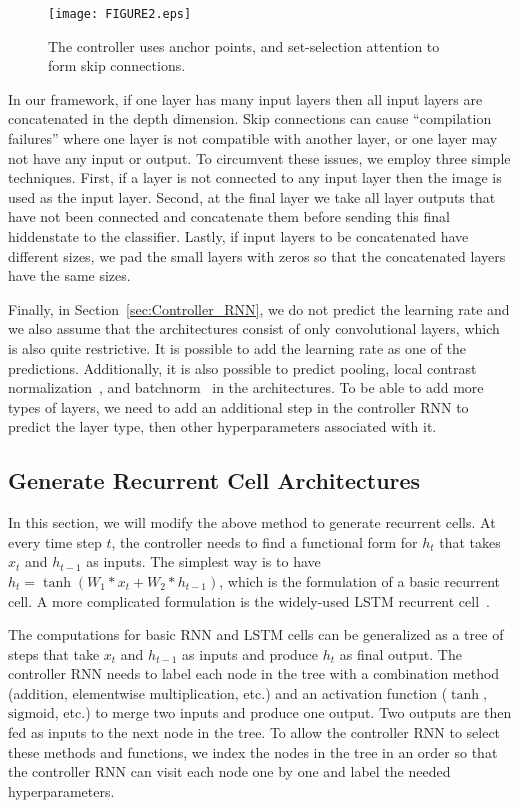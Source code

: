\documentclass{article} \usepackage{iclr2017_conference,times}
\begin{document}
\begin{figure}[h!]
\begin{center}
\centerline{\texttt{[image: FIGURE2.eps]}}
\caption{The controller uses anchor points, and set-selection attention to form skip connections.}
\label{figure:Controller_RNN_PTR}
\end{center}
\end{figure} 

In our framework, if one layer has many input layers then all input layers are concatenated in the depth dimension. Skip connections can cause ``compilation failures'' where one layer is not compatible with another layer, or one layer may not have any input or output. To circumvent these issues, we employ three simple techniques. First, if a layer is not connected to any input layer then the image is used as the input layer. Second, at the final layer we take all layer outputs that have not been connected and concatenate them before sending this final hiddenstate to the classifier. Lastly, if input layers to be concatenated have different sizes, we pad the small layers with zeros so that the concatenated layers have the same sizes. 

Finally, in Section~\ref{sec:Controller_RNN}, we do not predict the learning rate and we also assume that the architectures consist of only convolutional layers, which is also quite restrictive. It is possible to add the learning rate as one of the predictions. Additionally, it is also possible to predict pooling, local contrast normalization~\citep{jarrett2009best,krizhevsky2012imagenet}, and batchnorm~\citep{BatchNorm} in the architectures. To be able to add more types of layers, we need to add an additional step in the controller RNN to predict the layer type, then other hyperparameters associated with it. 


\subsection{Generate Recurrent Cell Architectures}
\label{sec:recurrent_cell}
In this section, we will modify the above method to generate recurrent cells. At every time step $t$, the controller needs to find a functional form for $h_t$ that takes $x_t$ and $h_{t-1}$ as inputs. The simplest way is to have $h_t = \tanh(W_1 * x_t + W_2 * h_{t-1})$, which is the formulation of a basic recurrent cell. A more complicated formulation is the widely-used LSTM recurrent cell~\citep{lstm}.


The computations for basic RNN and LSTM cells can be generalized as a tree of steps that take $x_t$ and $h_{t-1}$ as inputs and produce $h_t$ as final output. The controller RNN needs to label each node in the tree with a combination method (addition, elementwise multiplication, etc.) and an activation function ($\tanh$, $\mathrm{sigmoid}$, etc.) to merge two inputs and produce one output. Two outputs are then fed as inputs to the next node in the tree. To allow the controller RNN to select these methods and functions, we index the nodes in the tree in an order so that the controller RNN can visit each node one by one and label the needed hyperparameters.
\end{document}

